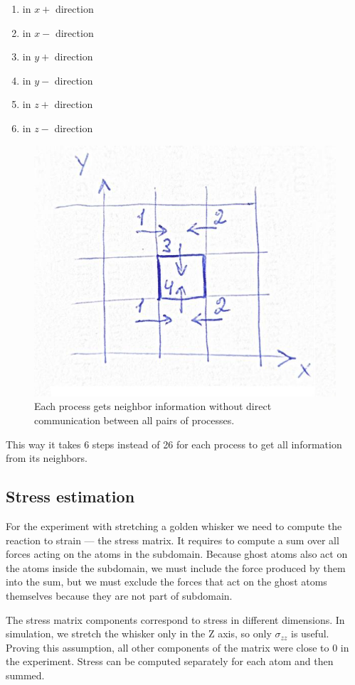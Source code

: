 \documentclass[12pt,a4paper]{article}
\begin{document}
\begin{enumerate}
	\item in $x+$ direction
	\item in $x-$ direction
	\item in $y+$ direction
	\item in $y-$ direction
	\item in $z+$ direction
	\item in $z-$ direction
\end{enumerate}

\begin{figure}[h!]
	\centering
	\includegraphics[width=.5\linewidth]{img/milestone08-domain-communication.jpg}
	\caption{Each process gets neighbor information without direct communication between all pairs of processes.}
	\label{fig:domain-communication}
\end{figure}

This way it takes 6 steps instead of 26 for each process to get all information from its neighbors.

\subsection*{Stress estimation}

For the experiment with stretching a golden whisker we need to compute the reaction to strain --- the stress matrix. It requires to compute a sum over all forces acting on the atoms in the subdomain. Because ghost atoms also act on the atoms inside the subdomain, we must include the force produced by them into the sum, but we must exclude the forces that act on the ghost atoms themselves because they are not part of subdomain.

The stress matrix components correspond to stress in different dimensions. In simulation, we stretch the whisker only in the Z axis, so only $\sigma_{zz}$ is useful. Proving this assumption, all other components of the matrix were close to 0 in the experiment. Stress can be computed separately for each atom and then summed.
\end{document}
